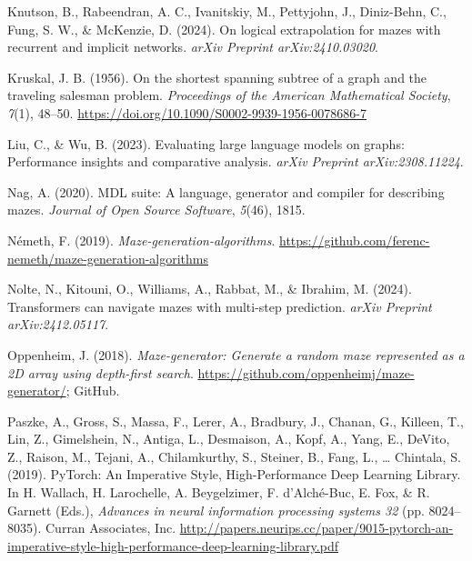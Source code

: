 \documentclass[10pt,a4paper,onecolumn]{article}
\newlength{\cslhangindent}
\newenvironment{CSLReferences}[2] %
 {\begin{list}{}{%
  \setlength{\itemindent}{0pt}
  \setlength{\leftmargin}{0pt}
  \setlength{\parsep}{0pt}
  \ifodd #1
   \setlength{\leftmargin}{\cslhangindent}
   \setlength{\itemindent}{-1\cslhangindent}
  \fi
  \setlength{\itemsep}{#2\baselineskip}}}
 {\end{list}}
\begin{document}
\begin{CSLReferences}{1}{0.5}
\leavevmode{}%
Knutson, B., Rabeendran, A. C., Ivanitskiy, M., Pettyjohn, J.,
Diniz-Behn, C., Fung, S. W., \& McKenzie, D. (2024). On logical
extrapolation for mazes with recurrent and implicit networks.
\emph{arXiv Preprint arXiv:2410.03020}.

\leavevmode{}%
Kruskal, J. B. (1956). On the shortest spanning subtree of a graph and
the traveling salesman problem. \emph{Proceedings of the American
Mathematical Society}, \emph{7}(1), 48--50.
\url{https://doi.org/10.1090/S0002-9939-1956-0078686-7}

\leavevmode{}%
Liu, C., \& Wu, B. (2023). Evaluating large language models on graphs:
Performance insights and comparative analysis. \emph{arXiv Preprint
arXiv:2308.11224}.

\leavevmode{}%
Nag, A. (2020). MDL suite: A language, generator and compiler for
describing mazes. \emph{Journal of Open Source Software}, \emph{5}(46),
1815.

\leavevmode{}%
Németh, F. (2019). \emph{Maze-generation-algorithms}.
\url{https://github.com/ferenc-nemeth/maze-generation-algorithms}

\leavevmode{}%
Nolte, N., Kitouni, O., Williams, A., Rabbat, M., \& Ibrahim, M. (2024).
Transformers can navigate mazes with multi-step prediction. \emph{arXiv
Preprint arXiv:2412.05117}.

\leavevmode{}%
Oppenheim, J. (2018). \emph{Maze-generator: Generate a random maze
represented as a 2D array using depth-first search}.
\url{https://github.com/oppenheimj/maze-generator/}; GitHub.

\leavevmode{}%
Paszke, A., Gross, S., Massa, F., Lerer, A., Bradbury, J., Chanan, G.,
Killeen, T., Lin, Z., Gimelshein, N., Antiga, L., Desmaison, A., Kopf,
A., Yang, E., DeVito, Z., Raison, M., Tejani, A., Chilamkurthy, S.,
Steiner, B., Fang, L., \ldots{} Chintala, S. (2019). {PyTorch: An
Imperative Style, High-Performance Deep Learning Library}. In H.
Wallach, H. Larochelle, A. Beygelzimer, F. d'Alché-Buc, E. Fox, \& R.
Garnett (Eds.), \emph{Advances in neural information processing systems
32} (pp. 8024--8035). Curran Associates, Inc.
\url{http://papers.neurips.cc/paper/9015-pytorch-an-imperative-style-high-performance-deep-learning-library.pdf}


\end{CSLReferences}
\end{document}
